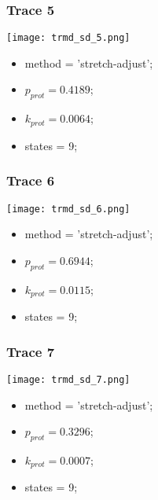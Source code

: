 \subsubsection{Trace 5}
\begin{minipage}[c]{0.7\textwidth}
    \texttt{[image: trmd\_sd\_5.png]}
\end{minipage}
\hfill
\begin{minipage}[c]{0.45\textwidth}
    \begin{itemize}
        \item method = 'stretch-adjust';
        \item $p_{prot}=0.4189$;
        \item $k_{prot}=0.0064$;
        \item states = 9;
    \end{itemize}
\end{minipage}

\subsubsection{Trace 6}
\begin{minipage}[c]{0.7\textwidth}
    \texttt{[image: trmd\_sd\_6.png]}
\end{minipage}
\hfill
\begin{minipage}[c]{0.45\textwidth}
    \begin{itemize}
        \item method = 'stretch-adjust';
        \item $p_{prot}=0.6944$;
        \item $k_{prot}=0.0115$;
        \item states = 9;
    \end{itemize}
\end{minipage}

\subsubsection{Trace 7}
\begin{minipage}[c]{0.7\textwidth}
    \texttt{[image: trmd\_sd\_7.png]}
\end{minipage}
\hfill
\begin{minipage}[c]{0.45\textwidth}
    \begin{itemize}
        \item method = 'stretch-adjust';
        \item $p_{prot}=0.3296$;
        \item $k_{prot}=0.0007$;
        \item states = 9;
    \end{itemize}
\end{minipage}

